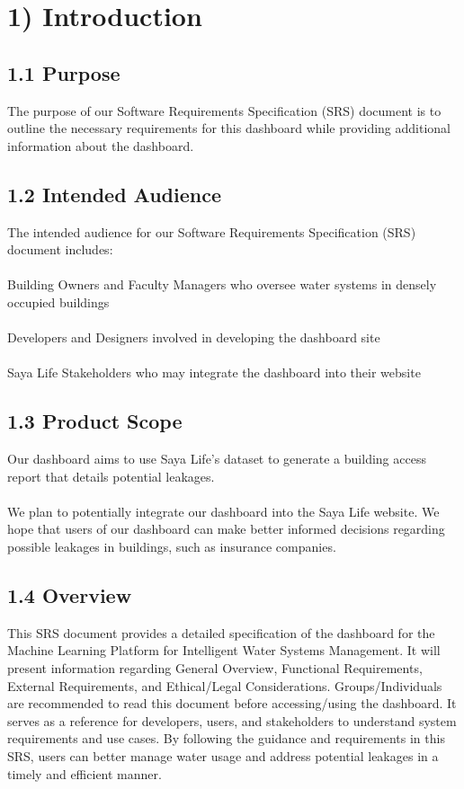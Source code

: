 \documentclass[10pt]{article}
\begin{document}
\section*{1) Introduction}
\subsection*{1.1 Purpose}
The purpose of our Software Requirements Specification (SRS) document is to outline the necessary requirements for this dashboard while providing additional information about the dashboard.

\subsection*{1.2 Intended Audience}
The intended audience for our Software Requirements Specification (SRS) document includes:\\\\
Building Owners and Faculty Managers who oversee water systems in densely occupied buildings\\\\
Developers and Designers involved in developing the dashboard site\\\\
Saya Life Stakeholders who may integrate the dashboard into their website

\subsection*{1.3 Product Scope}
Our dashboard aims to use Saya Life's dataset to generate a building access report that details potential leakages.\\\\
We plan to potentially integrate our dashboard into the Saya Life website. We hope that users of our dashboard can make better informed decisions regarding possible leakages in buildings, such as insurance companies.

\subsection*{1.4 Overview}
This SRS document provides a detailed specification of the dashboard for the Machine Learning Platform for Intelligent Water Systems Management. It will present information regarding General Overview, Functional Requirements, External Requirements, and Ethical/Legal Considerations. Groups/Individuals are recommended to read this document before accessing/using the dashboard. It serves as a reference for developers, users, and stakeholders to understand system requirements and use cases. By following the guidance and requirements in this SRS, users can better manage water usage and address potential leakages in a timely and efficient manner.
\end{document}
